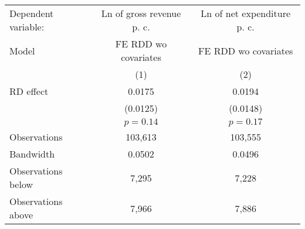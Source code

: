 \begin{tabular}{lcc}
  \toprule
 \midrule
Dependent variable: & Ln of gross revenue \acs{p. c.} & Ln of net expenditure \acs{p. c.} \\ 
 Model & \acs{FE} \acs{RDD} \acs{wo} covariates & \acs{FE} \acs{RDD} \acs{wo} covariates \\ 
   & (1) & (2) \\ 
   \midrule
\ac{RD} effect & 0.0175 & 0.0194 \\ 
   & (0.0125) & (0.0148) \\ 
   & $p=0.14$ & $p=0.17$ \\ 
   \midrule
  Observations & 103,613 & 103,555 \\ 
  Bandwidth & 0.0502 & 0.0496 \\ 
  Observations below & 7,295 & 7,228 \\ 
  Observations above & 7,966 & 7,886 \\ 
   \midrule
 \bottomrule
\end{tabular}
